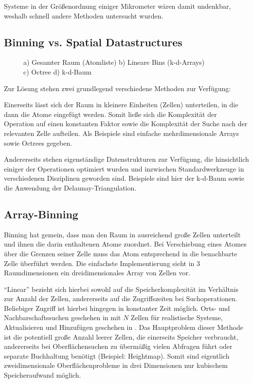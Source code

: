Systeme in der Größenordnung einiger Mikrometer wären damit undenkbar, weshalb schnell andere Methoden untersucht wurden.

\subsection{Binning vs. Spatial Datastructures}

\begin{figure}[btp]
  \centering
  \def\svgwidth{\textwidth}
  
  \caption[Räumliche Datenstrukturen]{
    a) Gesamter Raum (Atomliste)
    b) Lineare Bins (k-d-Arrays)
    \\
    c) Octree
    d) k-d-Baum
  }
  \label{fig:datastructures}
\end{figure}

Zur Lösung stehen zwei grundlegend verschiedene Methoden zur Verfügung:

Einerseits lässt sich der Raum in kleinere Einheiten (Zellen) unterteilen, in die dann die Atome eingefügt werden.
Somit ließe sich die Komplexität der Operation auf einen konstanten Faktor sowie die Komplexität der Suche nach der relevanten Zelle aufteilen.
Als Beispiele sind einfache mehrdimensionale Arrays sowie Octrees gegeben.

Andererseits stehen eigenständige Datenstrukturen zur Verfügung, die hinsichtlich einiger der Operationen optimiert wurden und inzwischen Standardwerkzeuge in verschiedenen Disziplinen geworden sind.
Beispiele sind hier der k-d-Baum sowie die Anwendung der Delaunay-Triangulation.

\subsection{Array-Binning}

Binning hat gemein, dass man den Raum in ausreichend große Zellen unterteilt und ihnen die darin enthaltenen Atome zuordnet.
Bei Verschiebung eines Atomes über die Grenzen seiner Zelle muss das Atom entsprechend in die benachbarte Zelle überführt werden.
Die einfachste Implementierung sieht in 3 Raumdimensionen ein dreidimensionales Array von Zellen vor.

``Linear'' bezieht sich hierbei sowohl auf die Speicherkomplexität im Verhältnis zur Anzahl der Zellen, andererseits auf die Zugriffszeiten bei Suchoperationen. Beliebiger Zugriff ist hierbei hingegen in konstanter Zeit möglich.
Orts- und Nachbarschaftssuchen geschehen in  mit $N$ Zellen für realistische Systeme, Aktualisieren und Hinzufügen geschehen in .
Das Hauptproblem dieser Methode ist die potentiell große Anzahl leerer Zellen, die einerseits Speicher verbraucht, andererseits bei Oberflächensuchen zu übermäßig vielen Abfragen führt oder separate Buchhaltung benötigt (Beispiel: Heightmap).
Somit sind eigentlich zweidimensionale Oberflächenprobleme in drei Dimensionen nur kubischem Speicheraufwand möglich.

